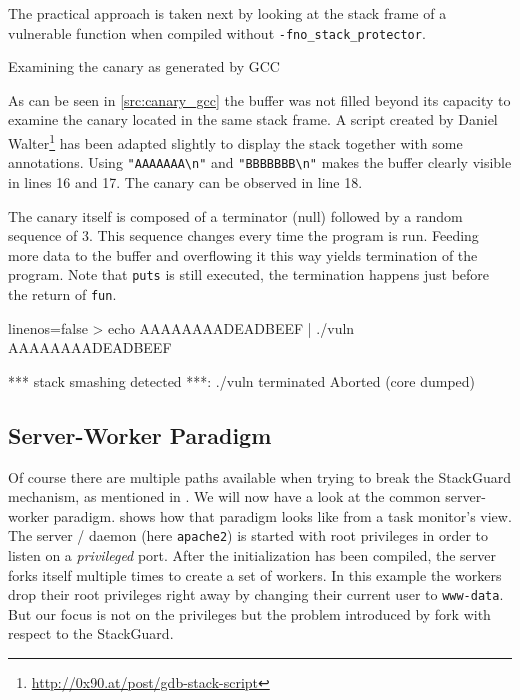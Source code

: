 \documentclass[article]{uibk}
\begin{document}
The practical approach is taken next by looking at the stack frame of a
vulnerable function when compiled without \texttt{-fno\_stack\_protector}.

\begin{listing}[h!]
    \begin{minipage}[t]{0.32\textwidth}
    \end{minipage}
    \begin{minipage}[t]{0.33\textwidth}
    \end{minipage}
    \begin{minipage}[t]{0.33\textwidth}
    \end{minipage}
    \caption{Examining the canary as generated by GCC}
    \label{src:canary_gcc}
\end{listing}

As can be seen in \cref{src:canary_gcc} the buffer was not filled beyond its
capacity to examine the canary located in the same stack frame. A script
created by Daniel Walter\footnote{\url{http://0x90.at/post/gdb-stack-script}}
has been adapted slightly to display the stack together with some annotations.
Using \texttt{"AAAAAAA\textbackslash{}n"} and
\texttt{"BBBBBBB\textbackslash{}n"} makes the buffer clearly visible in lines
16 and 17. The canary can be observed in line 18.

The canary itself is composed of a terminator (null) followed by a random
sequence of \SI{3}{\byte}. This sequence changes every time the program is run.
Feeding more data to the buffer and overflowing it this way yields termination
of the program. Note that \texttt{puts} is still executed, the termination
happens just before the return of \texttt{fun}.

\begin{code*}{linenos=false}
    > echo AAAAAAAADEADBEEF | ./vuln
    AAAAAAAADEADBEEF

    *** stack smashing detected ***: ./vuln terminated
    Aborted (core dumped)
\end{code*}

\subsection{Server-Worker Paradigm}

Of course there are multiple paths available when trying to break the
StackGuard mechanism, as mentioned in \cite{phrack_stack_guard}. We will now
have a look at the common server-worker paradigm. 
shows how that paradigm looks like from a task monitor's view. The server /
daemon (here \texttt{apache2}) is started with root privileges in order to
listen on a \textit{privileged} port. After the initialization has been
compiled, the server forks itself multiple times to create a set of workers. In
this example the workers drop their root privileges right away by changing
their current user to \texttt{www-data}. But our focus is not on the privileges
but the problem introduced by fork with respect to the StackGuard.
\end{document}
